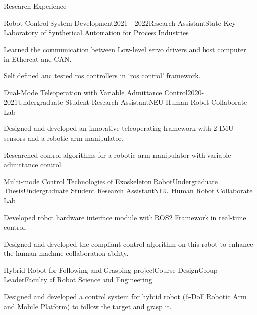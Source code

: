 \begin{rSection}{Research Experience}

\begin{rSubsection}{Robot Control System Development}{2021 - 2022}{Research Assistant}{State Key Laboratory of Synthetical Automation for Process Industries}
  \item Learned the communication between Low-level servo drivers and host computer in Ethercat and CAN.
  \item Self defined and tested ros controllers in `ros control' framework.
\end{rSubsection}

\begin{rSubsection}{Dual-Mode Teleoperation with Variable Admittance Control}{2020-2021}{Undergraduate Student Research Assistant}{NEU Human Robot Collaborate Lab}
  \item Designed and developed an innovative teleoperating framework with 2 IMU sensors and a robotic arm manipulator.
  \item Researched control algorithms for a robotic arm manipulator with variable admittance control.
\end{rSubsection}

\begin{rSubsection}{Multi-mode Control Technologies of Exoskeleton Robot}{Undergraduate Thesis}{Undergraduate Student Research Assistant}{NEU Human Robot Collaborate Lab}
  \item Developed robot hardware interface module with ROS2 Framework in real-time control.
  \item Designed and developed the compliant control algorithm on this robot to enhance the human machine collaboration ability.
\end{rSubsection}

\begin{rSubsection}{Hybrid Robot for Following and Grasping project}{Course Design}{Group Leader}{Faculty of Robot Science and Engineering}
  \item Designed and developed a control system for hybrid robot (6-DoF Robotic Arm and Mobile Platform) to follow the target and grasp it.
\end{rSubsection}

\end{rSection}

